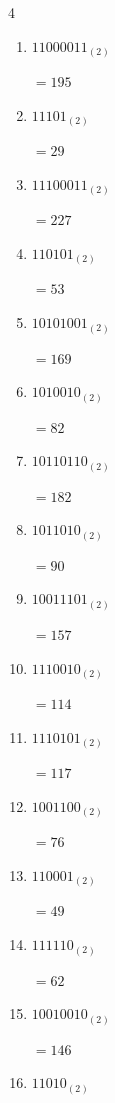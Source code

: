 \begin{multicols}{4}
\begin{enumerate}
        $=111$

  \item $11000011_{(2)}$

        $=195$

  \item $11101_{(2)}$

        $=29$

  \item $11100011_{(2)}$

        $=227$

  \item $110101_{(2)}$

        $=53$

  \item $10101001_{(2)}$

        $=169$

  \item $1010010_{(2)}$

        $=82$

  \item $10110110_{(2)}$

        $=182$

\columnbreak %

  \item $1011010_{(2)}$

        $=90$

  \item $10011101_{(2)}$

        $=157$

  \item $1110010_{(2)}$

        $=114$

  \item $1110101_{(2)}$

        $=117$

  \item $1001100_{(2)}$

        $=76$

  \item $110001_{(2)}$

        $=49$

  \item $111110_{(2)}$

        $=62$

  \item $10010010_{(2)}$

        $=146$

  \item $11010_{(2)}$


\end{enumerate}
\end{multicols}
